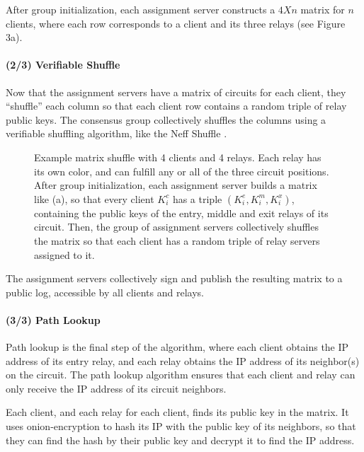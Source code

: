 After group initialization, each assignment server constructs a $4 X n$ matrix for $n$ clients, where each row corresponds to a client and its three relays (see Figure 3a). 

\paragraph{(2/3) Verifiable Shuffle}
Now that the assignment servers have a matrix of circuits for each client, they
``shuffle'' each column so that each client row contains a random triple of
relay public keys. The consensus group collectively shuffles the columns using
a verifiable shuffling algorithm, like the Neff Shuffle \cite{neff2001verifiable}.

\begin{figure}[htb]
\centering
\hspace{\fill}%
\hspace{\fill}%
\hspace*{\fill}%
\caption[bla]{Example matrix shuffle with 4 clients and 4 relays. Each relay
has its own color, and can fulfill any or all of the three circuit positions.
After group initialization, each assignment server builds a matrix like (a), 
so that  every client $K^c_i$ has a triple $(K^e_i, K^m_i, K^x_i)$, containing the public keys of the entry, middle and exit relays of its circuit. Then, the
group of assignment servers collectively shuffles the matrix so that each client has a random triple of relay servers assigned to it.}
\end{figure}

The assignment servers collectively sign and publish the resulting matrix to a public log, accessible by all clients and relays. 

\paragraph{(3/3) Path Lookup}
Path lookup is the final step of the algorithm, where each client obtains the
IP address of its entry relay, and each relay obtains the IP address of its
neighbor(s) on the circuit. The path lookup algorithm ensures that each client
and relay can only receive the IP address of its circuit neighbors.

Each client, and each relay for each client, finds its public key in the matrix.
It uses onion-encryption to hash its IP with the public key of its neighbors,
so that they can find the hash by their public key and decrypt it to find the IP address. 

